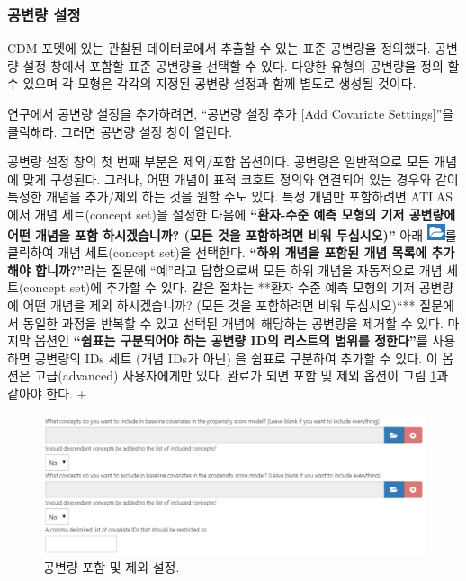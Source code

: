 \documentclass[11pt]{book}
\theoremstyle{definition}
\theoremstyle{definition}
\theoremstyle{definition}
\theoremstyle{remark}
\begin{document}
\subsubsection*{공변량 설정}\label{-}

CDM 포멧에 있는 관찰된 데이터로에서 추출할 수 있는 표준 공변량을
정의했다. 공변량 설정 창에서 포함할 표준 공변량을 선택할 수 있다. 다양한
유형의 공변량을 정의 할 수 있으며 각 모형은 각각의 지정된 공변량 설정과
함께 별도로 생성될 것이다.

연구에서 공변량 설정을 추가하려면, ``공변량 설정 추가 {[}Add Covariate
Settings{]}''을 클릭해라. 그러면 공변량 설정 창이 열린다.

공변량 설정 창의 첫 번째 부분은 제외/포함 옵션이다. 공변량은 일반적으로
모든 개념에 맞게 구성된다. 그러나, 어떤 개념이 표적 코호트 정의와
연결되어 있는 경우와 같이 특정한 개념을 추가/제외 하는 것을 원할 수도
있다. 특정 개념만 포함하려면 ATLAS에서 개념 세트(concept set)을 설정한
다음에 \textbf{``환자-수준 예측 모형의 기저 공변량에 어떤 개념을 포함
하시겠습니까? (모든 것을 포함하려면 비워 두십시오)''} 아래
\includegraphics{images/PopulationLevelEstimation/open.png}를 클릭하여
개념 세트(concept set)을 선택한다. \textbf{``하위 개념을 포함된 개념
목록에 추가해야 합니까?''}라는 질문에 ``예''라고 답함으로써 모든 하위
개념을 자동적으로 개념 세트(concept set)에 추가할 수 있다. 같은 절차는
**환자 수준 예측 모형의 기저 공변량에 어떤 개념을 제외 하시겠습니까?
(모든 것을 포함하려면 비워 두십시오)``** 질문에서 동일한 과정을 반복할
수 있고 선택된 개념에 해당하는 공변량을 제거할 수 있다. 마지막 옵션인
\textbf{``쉼표는 구분되어야 하는 공변량 ID의 리스트의 범위를 정한다''}를
사용하면 공변량의 IDs 세트 (개념 IDs가 아닌) 을 쉼표로 구분하여 추가할
수 있다. 이 옵션은 고급(advanced) 사용자에게만 있다. 완료가 되면 포함 및
제외 옵션이 그림 \ref{fig:covariateSettings1}과 같아야 한다. +

\begin{figure}

{\centering \includegraphics[width=1\linewidth]{images/PatientLevelPrediction/covariateSettings1} 

}

\caption{공변량 포함 및 제외 설정.}\label{fig:covariateSettings1}
\end{figure}
\end{document}
